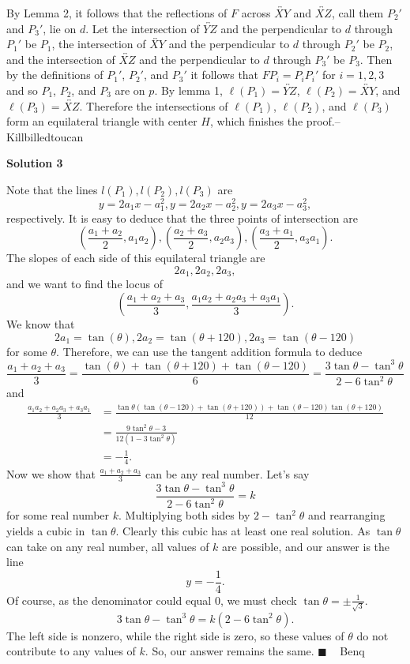 \begin{enumerate}
 By Lemma 2, it follows that the reflections of $F$ across $\overleftrightarrow{XY}$ and $\overleftrightarrow{XZ}$, call them $P_2'$ and $P_3'$, lie on $d$. Let the intersection of $\overleftrightarrow{YZ}$ and the perpendicular to $d$ through $P_1'$ be $P_1$, the intersection of $\overleftrightarrow{XY}$ and the perpendicular to $d$ through $P_2'$ be $P_2$, and the intersection of $\overleftrightarrow{XZ}$ and the perpendicular to $d$ through $P_3'$ be $P_3$. Then by the definitions of $P_1'$, $P_2'$, and $P_3'$ it follows that $FP_i=P_iP_i'$ for $i=1,2,3$ and so $P_1$, $P_2$, and $P_3$ are on $p$. By lemma 1, $\ell(P_1)=\overleftrightarrow{YZ}$, $\ell(P_2)=\overleftrightarrow{XY}$, and $\ell(P_3)=\overleftrightarrow{XZ}$. Therefore the intersections of $\ell(P_1)$, $\ell(P_2)$, and $\ell(P_3)$ form an equilateral triangle with center $H$, which finishes the proof.--Killbilledtoucan

 



\textbf{Solution 3}

Note that the lines $l(P_1), l(P_2), l(P_3)$ are 
 \[y=2a_1x-a_1^2, y=2a_2x-a_2^2, y=2a_3x-a_3^2,\] respectively. It is easy to deduce that the three points of intersection are 
 \[\left(\frac{a_1+a_2}{2},a_1a_2\right),\left(\frac{a_2+a_3}{2},a_2a_3\right), \left(\frac{a_3+a_1}{2},a_3a_1\right).\] The slopes of each side of this equilateral triangle are 
 \[2a_1,2a_2,2a_3,\] and we want to find the locus of 
 \[\left(\frac{a_1+a_2+a_3}{3},\frac{a_1a_2+a_2a_3+a_3a_1}{3}\right).\] We know that 
 \[2a_1=\tan(\theta), 2a_2=\tan (\theta + 120), 2a_3=\tan (\theta-120)\] for some $\theta.$ Therefore, we can use the tangent addition formula to deduce 
 \[\frac{a_1+a_2+a_3}{3}=\frac{\tan(\theta)+\tan (\theta + 120)+\tan (\theta-120)}{6}=\frac{3\tan\theta-\tan^3\theta}{2-6\tan^2\theta}\] and 
 \begin{align*} \frac{a_1a_2+a_2a_3+a_3a_1}{3}&=\frac{\tan\theta (\tan(\theta-120)+\tan(\theta+120))+\tan(\theta-120)\tan(\theta+120)}{12}\\ &=\frac{9\tan^2\theta-3}{12(1-3\tan^2\theta)}\\ &=-\frac{1}{4}.\end{align*}
 Now we show that $\frac{a_1+a_2+a_3}{3}$ can be any real number. Let's say 
 \[\frac{3\tan\theta-\tan^3\theta}{2-6\tan^2\theta}=k\] for some real number $k.$ Multiplying both sides by $2-\tan^2\theta$ and rearranging yields a cubic in $\tan\theta.$ Clearly this cubic has at least one real solution. As $\tan \theta$ can take on any real number, all values of $k$ are possible, and our answer is the line 
 \[\boxed{y=-\frac{1}{4}.}\] Of course, as the denominator could equal 0, we must check $\tan \theta=\pm \frac{1}{\sqrt{3}}.$ 
 \[3\tan \theta-\tan^3\theta=k(2-6\tan^2\theta).\] The left side is nonzero, while the right side is zero, so these values of $\theta$ do not contribute to any values of $k.$ So, our answer remains the same. $\blacksquare$ ~ Benq


\end{enumerate}
